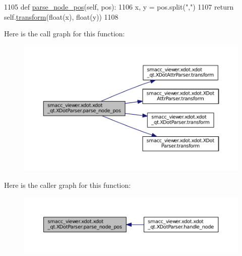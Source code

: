\begin{DoxyCode}
1105     \textcolor{keyword}{def }\hyperlink{classsmacc__viewer_1_1xdot_1_1xdot__qt_1_1XDotParser_aa5cb738f4fd0fce23b59263fcfe82208}{parse\_node\_pos}(self, pos):
1106         x, y = pos.split(\textcolor{stringliteral}{","})
1107         \textcolor{keywordflow}{return} self.\hyperlink{classsmacc__viewer_1_1xdot_1_1xdot__qt_1_1XDotParser_ab136f7aaca27f3d01f24c816a276b929}{transform}(float(x), float(y))
1108 
\end{DoxyCode}


Here is the call graph for this function\+:
\nopagebreak
\begin{figure}[H]
\begin{center}
\leavevmode
\includegraphics[width=350pt]{classsmacc__viewer_1_1xdot_1_1xdot__qt_1_1XDotParser_aa5cb738f4fd0fce23b59263fcfe82208_cgraph}
\end{center}
\end{figure}




Here is the caller graph for this function\+:
\nopagebreak
\begin{figure}[H]
\begin{center}
\leavevmode
\includegraphics[width=350pt]{classsmacc__viewer_1_1xdot_1_1xdot__qt_1_1XDotParser_aa5cb738f4fd0fce23b59263fcfe82208_icgraph}
\end{center}
\end{figure}



